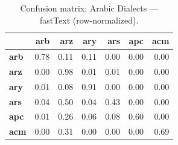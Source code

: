 \begin{table}[htbp]
\centering
\small
\begin{tabular}{lrrrrrr}
\toprule
 & \textbf{arb} & \textbf{arz} & \textbf{ary} & \textbf{ars} & \textbf{apc} & \textbf{acm} \\
\midrule
\textbf{arb} & \cellcolor{blue!77}\color{white}0.78 & \cellcolor{blue!10}0.11 & \cellcolor{blue!10}0.11 & \cellcolor{blue!0}0.00 & \cellcolor{blue!0}0.00 & \cellcolor{blue!0}0.00 \\
\textbf{arz} & \cellcolor{blue!0}0.00 & \cellcolor{blue!98}\color{white}0.98 & \cellcolor{blue!0}0.01 & \cellcolor{blue!0}0.01 & \cellcolor{blue!0}0.00 & \cellcolor{blue!0}0.00 \\
\textbf{ary} & \cellcolor{blue!0}0.01 & \cellcolor{blue!7}0.08 & \cellcolor{blue!91}\color{white}0.91 & \cellcolor{blue!0}0.00 & \cellcolor{blue!0}0.00 & \cellcolor{blue!0}0.00 \\
\textbf{ars} & \cellcolor{blue!3}0.04 & \cellcolor{blue!50}0.50 & \cellcolor{blue!3}0.04 & \cellcolor{blue!42}0.43 & \cellcolor{blue!0}0.00 & \cellcolor{blue!0}0.00 \\
\textbf{apc} & \cellcolor{blue!0}0.01 & \cellcolor{blue!25}0.26 & \cellcolor{blue!5}0.06 & \cellcolor{blue!7}0.08 & \cellcolor{blue!59}\color{white}0.60 & \cellcolor{blue!0}0.00 \\
\textbf{acm} & \cellcolor{blue!0}0.00 & \cellcolor{blue!30}0.31 & \cellcolor{blue!0}0.00 & \cellcolor{blue!0}0.00 & \cellcolor{blue!0}0.00 & \cellcolor{blue!69}\color{white}0.69 \\
\bottomrule
\end{tabular}
\caption{Confusion matrix: Arabic Dialects — fastText (row-normalized).}
\label{tab:cm-arabic_dialects-fasttext}
\end{table}